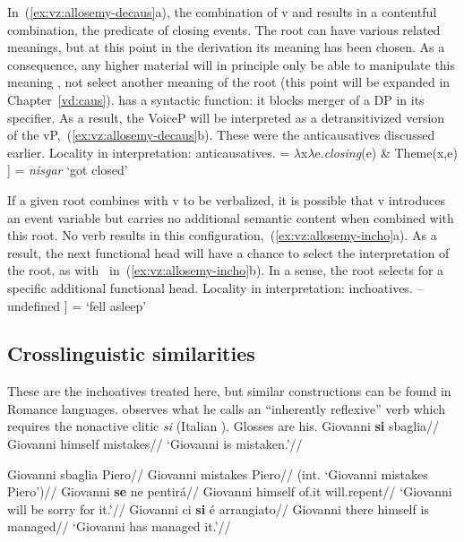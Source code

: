 {In~(\ref{ex:vz:allosemy-decaus}a), the combination of v and  results in a contentful combination, the predicate of closing events. The root can have various related meanings, but at this point in the derivation its meaning has been chosen. As a consequence, any higher material will in principle only be able to manipulate this meaning \citep{arad03}, not select another meaning of the root (this point will be expanded in Chapter~\ref{vd:caus}). {\vz} has a syntactic function: it blocks merger of a DP in its specifier. As a result, the VoiceP will be interpreted as a detransitivized version of the vP,~(\ref{ex:vz:allosemy-decaus}b). These were the anticausatives discussed earlier.
\pex Locality in interpretation: anticausatives.\label{ex:vz:allosemy-decaus}
    \a {} = $\lambda$x$\lambda$e.\emph{closing}(e) \& Theme(x,e)
    \a {[} \fbox{\textbf{\vz}}  ] = \emph{nisgar} `got closed'
\xe

If a given root combines with v to be verbalized, it is possible that v introduces an event variable but carries no additional semantic content when combined with this root. No verb results in this configuration,~(\ref{ex:vz:allosemy-incho}a). As a result, the next functional head will have a chance to select the interpretation of the root, as with \vz~in~(\ref{ex:vz:allosemy-incho}b). In a sense, the root selects for a specific additional functional head.
\pex Locality in interpretation: inchoatives.\label{ex:vz:allosemy-incho}
    \a {} -- undefined
    \a {[} \fbox{\textbf{\vz}}  ] = `fell asleep'
\xe

	\subsection{Crosslinguistic similarities}
These are the inchoatives treated here, but similar constructions can be found in Romance languages. \cite{burzio86} observes what he calls an ``inherently reflexive'' verb which requires the nonactive clitic \emph{si} (Italian ). Glosses are his.
\pex
	\a \begingl
		\gla Giovanni \textbf{si} sbaglia//
		\glb Giovanni himself mistakes//
		\glft `Giovanni is mistaken.'//
	\endgl
	
	\a \ljudge{*} \begingl
		\gla Giovanni sbaglia Piero//
		\glb Giovanni mistakes Piero//
		\glft (int. `Giovanni mistakes Piero')//
	\endgl
\xe
\ex
	\begingl
		\gla Giovanni \textbf{se} ne pentir\'a//
		\glb Giovanni himself of.it will.repent//
		\glft `Giovanni will be sorry for it.'//
	\endgl
\xe
\ex
	\begingl
		\gla Giovanni ci \textbf{si} \'e arrangiato//
		\glb Giovanni there himself is managed//
		\glft `Giovanni has managed it.'//
	\endgl
\xe

}
